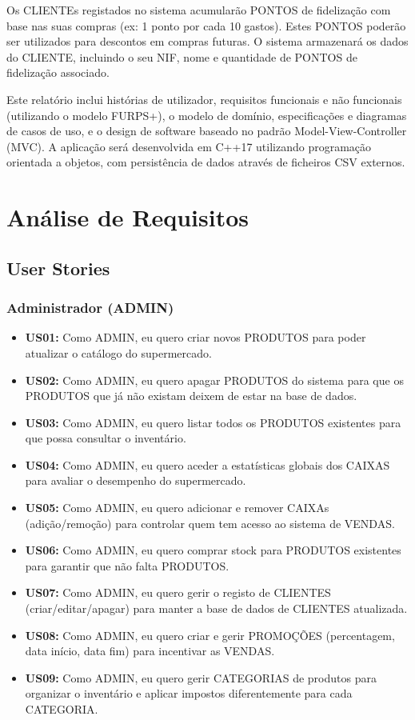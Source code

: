 \documentclass[a4paper]{llncs}
\begin{document}
Os CLIENTEs registados no sistema acumularão PONTOS de fidelização com base nas suas compras (ex: 1 ponto por cada 10\texteuro{} gastos). Estes PONTOS poderão ser utilizados para descontos em compras futuras. O sistema armazenará os dados do CLIENTE, incluindo o seu NIF, nome e quantidade de PONTOS de fidelização associado.

Este relatório inclui histórias de utilizador, requisitos funcionais e não funcionais (utilizando o modelo FURPS+), o modelo de domínio, especificações e diagramas de casos de uso, e o design de software baseado no padrão Model-View-Controller (MVC). A aplicação será desenvolvida em C++17 utilizando programação orientada a objetos, com persistência de dados através de ficheiros CSV externos.

\section{Análise de Requisitos}

\subsection{User Stories}

\subsubsection{Administrador (ADMIN)}
\begin{itemize}
    \item \textbf{US01:} Como ADMIN, eu quero criar novos PRODUTOS para poder atualizar o catálogo do supermercado.
    \item \textbf{US02:} Como ADMIN, eu quero apagar PRODUTOS do sistema para que os PRODUTOS que já não existam deixem de estar na base de dados.
    \item \textbf{US03:} Como ADMIN, eu quero listar todos os PRODUTOS existentes para que possa consultar o inventário.
    \item \textbf{US04:} Como ADMIN, eu quero aceder a estatísticas globais dos CAIXAS para avaliar o desempenho do supermercado.
    \item \textbf{US05:} Como ADMIN, eu quero adicionar e remover CAIXAs (adição/remoção) para controlar quem tem acesso ao sistema de VENDAS.
    \item \textbf{US06:} Como ADMIN, eu quero comprar stock para PRODUTOS existentes para garantir que não falta PRODUTOS.
    \item \textbf{US07:} Como ADMIN, eu quero gerir o registo de CLIENTES (criar/editar/apagar) para manter a base de dados de CLIENTES atualizada.
    \item \textbf{US08:} Como ADMIN, eu quero criar e gerir PROMOÇÕES (percentagem, data início, data fim) para incentivar as VENDAS.
    \item \textbf{US09:} Como ADMIN, eu quero gerir CATEGORIAS de produtos para organizar o inventário e aplicar impostos diferentemente para cada CATEGORIA.
\end{itemize}
\end{document}
